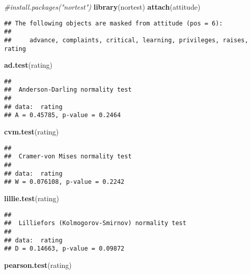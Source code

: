 \documentclass[]{article}
\newenvironment{Shaded}{\begin{snugshade}}{\end{snugshade}}
\newcommand{\KeywordTok}[1]{\textcolor[rgb]{0.13,0.29,0.53}{\textbf{#1}}}
\newcommand{\CommentTok}[1]{\textcolor[rgb]{0.56,0.35,0.01}{\textit{#1}}}
\newcommand{\NormalTok}[1]{#1}
\begin{document}
\begin{Shaded}
\begin{Highlighting}[]
\CommentTok{#install.packages("nortest")}
\KeywordTok{library}\NormalTok{(nortest)}
\KeywordTok{attach}\NormalTok{(attitude)}
\end{Highlighting}
\end{Shaded}

\begin{verbatim}
## The following objects are masked from attitude (pos = 6):
## 
##     advance, complaints, critical, learning, privileges, raises, rating
\end{verbatim}

\begin{Shaded}
\begin{Highlighting}[]
\KeywordTok{ad.test}\NormalTok{(rating)}
\end{Highlighting}
\end{Shaded}

\begin{verbatim}
## 
##  Anderson-Darling normality test
## 
## data:  rating
## A = 0.45785, p-value = 0.2464
\end{verbatim}

\begin{Shaded}
\begin{Highlighting}[]
\KeywordTok{cvm.test}\NormalTok{(rating)}
\end{Highlighting}
\end{Shaded}

\begin{verbatim}
## 
##  Cramer-von Mises normality test
## 
## data:  rating
## W = 0.076108, p-value = 0.2242
\end{verbatim}

\begin{Shaded}
\begin{Highlighting}[]
\KeywordTok{lillie.test}\NormalTok{(rating)}
\end{Highlighting}
\end{Shaded}

\begin{verbatim}
## 
##  Lilliefors (Kolmogorov-Smirnov) normality test
## 
## data:  rating
## D = 0.14663, p-value = 0.09872
\end{verbatim}

\begin{Shaded}
\begin{Highlighting}[]
\KeywordTok{pearson.test}\NormalTok{(rating)}
\end{Highlighting}
\end{Shaded}
\end{document}
